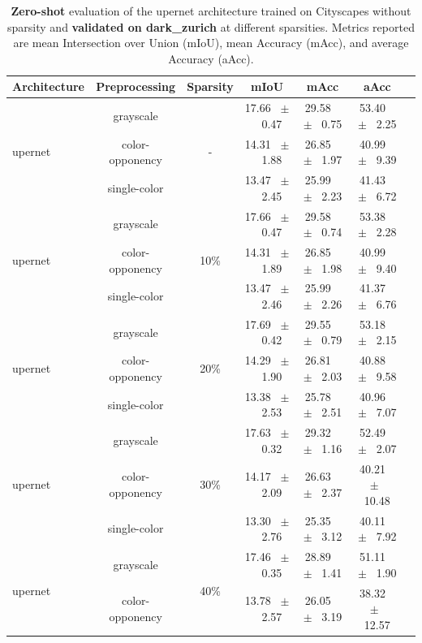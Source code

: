 \begin{table}[h]
  \centering
  \caption{\textbf{Zero-shot} evaluation of the upernet architecture trained on Cityscapes without sparsity and \textbf{validated on dark_zurich} at different sparsities. Metrics reported are mean Intersection over Union (mIoU), mean Accuracy (mAcc), and average Accuracy (aAcc).}
  \begin{tabular}{@{}lccc ccc@{}}
    \toprule
    Architecture & Preprocessing & Sparsity & mIoU & mAcc & aAcc \\
    \midrule
    \multirow{3}{*}{upernet} & grayscale & \multirow{3}{*}{-} & 17.66 ~$\pm$~ 0.47 & 29.58 ~$\pm$~ 0.75 & 53.40 ~$\pm$~ 2.25 \\
    & color-opponency &  & 14.31 ~$\pm$~ 1.88 & 26.85 ~$\pm$~ 1.97 & 40.99 ~$\pm$~ 9.39 \\
    & single-color &  & 13.47 ~$\pm$~ 2.45 & 25.99 ~$\pm$~ 2.23 & 41.43 ~$\pm$~ 6.72 \\
    \midrule
    \multirow{3}{*}{upernet} & grayscale & \multirow{3}{*}{10\%} & 17.66 ~$\pm$~ 0.47 & 29.58 ~$\pm$~ 0.74 & 53.38 ~$\pm$~ 2.28 \\
    & color-opponency &  & 14.31 ~$\pm$~ 1.89 & 26.85 ~$\pm$~ 1.98 & 40.99 ~$\pm$~ 9.40 \\
    & single-color &  & 13.47 ~$\pm$~ 2.46 & 25.99 ~$\pm$~ 2.26 & 41.37 ~$\pm$~ 6.76 \\
    \midrule
    \multirow{3}{*}{upernet} & grayscale & \multirow{3}{*}{20\%} & 17.69 ~$\pm$~ 0.42 & 29.55 ~$\pm$~ 0.79 & 53.18 ~$\pm$~ 2.15 \\
    & color-opponency &  & 14.29 ~$\pm$~ 1.90 & 26.81 ~$\pm$~ 2.03 & 40.88 ~$\pm$~ 9.58 \\
    & single-color &  & 13.38 ~$\pm$~ 2.53 & 25.78 ~$\pm$~ 2.51 & 40.96 ~$\pm$~ 7.07 \\
    \midrule
    \multirow{3}{*}{upernet} & grayscale & \multirow{3}{*}{30\%} & 17.63 ~$\pm$~ 0.32 & 29.32 ~$\pm$~ 1.16 & 52.49 ~$\pm$~ 2.07 \\
    & color-opponency &  & 14.17 ~$\pm$~ 2.09 & 26.63 ~$\pm$~ 2.37 & 40.21 ~$\pm$~ 10.48 \\
    & single-color &  & 13.30 ~$\pm$~ 2.76 & 25.35 ~$\pm$~ 3.12 & 40.11 ~$\pm$~ 7.92 \\
    \midrule
    \multirow{3}{*}{upernet} & grayscale & \multirow{3}{*}{40\%} & 17.46 ~$\pm$~ 0.35 & 28.89 ~$\pm$~ 1.41 & 51.11 ~$\pm$~ 1.90 \\
    & color-opponency &  & 13.78 ~$\pm$~ 2.57 & 26.05 ~$\pm$~ 3.19 & 38.32 ~$\pm$~ 12.57 \\

\end{tabular}
\end{table}
